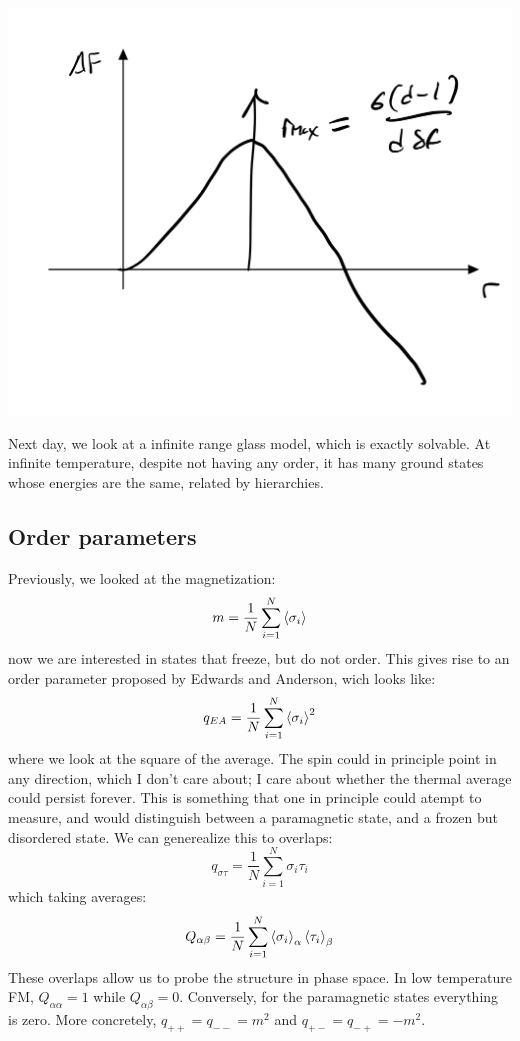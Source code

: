 \begin{center}
    \includegraphics[scale=0.35]{Lectures/Figures/lec13-freeenergybarrier.png}
\end{center}

Next day, we look at a infinite range glass model, which is exactly solvable. At infinite temperature, despite not having any order, it has many ground states whose energies are the same, related by hierarchies.

\subsection{Order parameters}
Previously, we looked at the magnetization:
\begin{equation}
    m = \frac{1}{N}\sum_{i=1}^N \left< \sigma_i \right>
\end{equation}
now we are interested in states that freeze, but do not order. This gives rise to an order parameter proposed by Edwards and Anderson, wich looks like:
\begin{equation}
    q_{EA} = \frac{1}{N}\sum_{i=1}^N \left< \sigma_i \right>^2
\end{equation}
where we look at the square of the average. The spin could in principle point in any direction, which I don't care about; I care about whether the thermal average could persist forever. This is something that one in principle could atempt to measure, and would distinguish between a paramagnetic state, and a frozen but disordered state. We can generealize this to overlaps:
\begin{equation}
    q_{\sigma\tau} = \frac{1}{N}\sum_{i=1}^N \sigma_i \tau_i
\end{equation}
which taking averages:
\begin{equation}
    Q_{\alpha\beta} = \frac{1}{N}\sum_{i=1}^N \left< \sigma_i \right>_{\alpha}\left< \tau_i \right>_{\beta}
\end{equation}
These overlaps allow us to probe the structure in phase space. In low temperature FM, $Q_{\alpha\alpha} = 1$ while $Q_{\alpha\beta} = 0$. Conversely, for the paramagnetic states everything is zero. More concretely, $q_{++} = q_{--} = m^2$ and $q_{+-} = q_{-+} = -m^2$.
